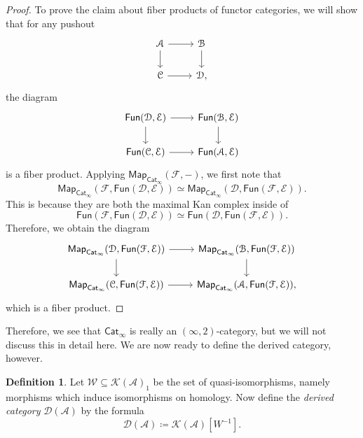 \documentclass[10pt]{amsart}
\theoremstyle{definition}
\newtheorem{defn}[thm]{Definition}
\theoremstyle{remark}
\theoremstyle{plain}
\theoremstyle{definition}
\theoremstyle{remark}
\newcommand{\mc}[1]{\mathcal{#1}}
\newcommand{\ms}[1]{\mathsf{#1}}
\newcommand{\1}{\mathbf{1}}
\newcommand{\2}{\mathbf{2}}
\newcommand{\3}{\mathbf{3}}
\begin{document}
\begin{proof}
    To prove the claim about fiber products of functor categories, we will show that for any pushout
    \begin{equation*}
    \begin{tikzcd}
        \mc{A} \ar{r} \ar{d} & \mc{B} \ar{d} \\
        \mc{C} \ar{r} & \mc{D},
    \end{tikzcd}
    \end{equation*}
    the diagram
    \begin{equation*}
    \begin{tikzcd}
        \ms{Fun}(\mc{D}, \mc{E}) \ar{r} \ar{d} & \ms{Fun}(\mc{B}, \mc{E}) \ar{d} \\
        \ms{Fun}(\mc{C}, \mc{E}) \ar{r} & \ms{Fun}(\mc{A}, \mc{E})
    \end{tikzcd}
    \end{equation*}
    is a fiber product. Applying $\ms{Map}_{\ms{Cat}_{\infty}}(\mc{F}, -)$, we first note that
    \[ \ms{Map}_{\ms{Cat}_{\infty}}(\mc{F}, \ms{Fun}(\mc{D}, \mc{E})) \simeq \ms{Map}_{\ms{Cat}_{\infty}}(\mc{D}, \ms{Fun}(\mc{F}, \mc{E})). \]
    This is because they are both the maximal Kan complex inside of
    \[ \ms{Fun}(\mc{F}, \ms{Fun}(\mc{D}, \mc{E})) \simeq \ms{Fun}(\mc{D}, \ms{Fun}(\mc{F}, \mc{E})). \]
    Therefore, we obtain the diagram
    \begin{equation*}
    \begin{tikzcd}
        \ms{Map}_{\ms{Cat}_{\infty}}(\mc{D}, \ms{Fun}(\mc{F}, \mc{E})) \ar{r} \ar{d} & \ms{Map}_{\ms{Cat}_{\infty}}(\mc{B}, \ms{Fun}(\mc{F}, \mc{E}))  \ar{d} \\
        \ms{Map}_{\ms{Cat}_{\infty}}(\mc{C}, \ms{Fun}(\mc{F}, \mc{E})) \ar{r} & \ms{Map}_{\ms{Cat}_{\infty}}(\mc{A}, \ms{Fun}(\mc{F}, \mc{E})),
    \end{tikzcd}
    \end{equation*}
    which is a fiber product.
\end{proof}

Therefore, we see that $\ms{Cat}_{\infty}$ is really an $(\infty, 2)$-category, but we will not discuss this in detail here. We are now ready to define the derived category, however.

\begin{defn}
    Let $\mc{W} \subseteq \mc{K}(\mc{A})_1$ be the set of quasi-isomorphisms, namely morphisms which induce isomorphisms on homology. Now define the \textit{derived category} $\mc{D}(\mc{A})$ by the formula
    \[ \mc{D}(\mc{A}) \coloneqq \mc{K}(\mc{A})[W^{-1}]. \]
\end{defn}
\end{document}
